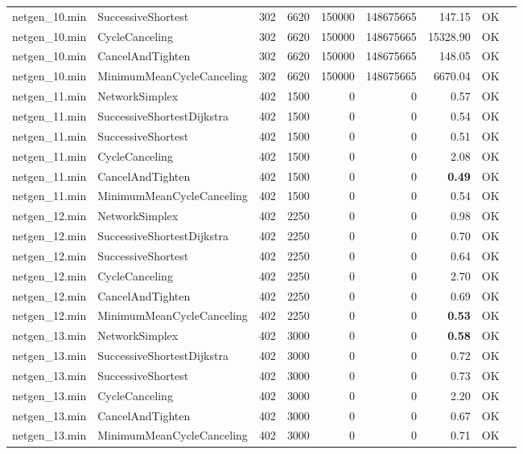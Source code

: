 \begin{longtable}{llrrrrrrl}
netgen\_10.min & SuccessiveShortest & 302 & 6620 & 150000 & 148675665 & 147.15 & OK \\
netgen\_10.min & CycleCanceling & 302 & 6620 & 150000 & 148675665 & 15328.90 & OK \\
netgen\_10.min & CancelAndTighten & 302 & 6620 & 150000 & 148675665 & 148.05 & OK \\
netgen\_10.min & MinimumMeanCycleCanceling & 302 & 6620 & 150000 & 148675665 & 6670.04 & OK \\
\midrule
netgen\_11.min & NetworkSimplex & 402 & 1500 & 0 & 0 & 0.57 & OK \\
netgen\_11.min & SuccessiveShortestDijkstra & 402 & 1500 & 0 & 0 & 0.54 & OK \\
netgen\_11.min & SuccessiveShortest & 402 & 1500 & 0 & 0 & 0.51 & OK \\
netgen\_11.min & CycleCanceling & 402 & 1500 & 0 & 0 & 2.08 & OK \\
netgen\_11.min & CancelAndTighten & 402 & 1500 & 0 & 0 & \textbf{0.49} & OK \\
netgen\_11.min & MinimumMeanCycleCanceling & 402 & 1500 & 0 & 0 & 0.54 & OK \\
\midrule
netgen\_12.min & NetworkSimplex & 402 & 2250 & 0 & 0 & 0.98 & OK \\
netgen\_12.min & SuccessiveShortestDijkstra & 402 & 2250 & 0 & 0 & 0.70 & OK \\
netgen\_12.min & SuccessiveShortest & 402 & 2250 & 0 & 0 & 0.64 & OK \\
netgen\_12.min & CycleCanceling & 402 & 2250 & 0 & 0 & 2.70 & OK \\
netgen\_12.min & CancelAndTighten & 402 & 2250 & 0 & 0 & 0.69 & OK \\
netgen\_12.min & MinimumMeanCycleCanceling & 402 & 2250 & 0 & 0 & \textbf{0.53} & OK \\
\midrule
netgen\_13.min & NetworkSimplex & 402 & 3000 & 0 & 0 & \textbf{0.58} & OK \\
netgen\_13.min & SuccessiveShortestDijkstra & 402 & 3000 & 0 & 0 & 0.72 & OK \\
netgen\_13.min & SuccessiveShortest & 402 & 3000 & 0 & 0 & 0.73 & OK \\
netgen\_13.min & CycleCanceling & 402 & 3000 & 0 & 0 & 2.20 & OK \\
netgen\_13.min & CancelAndTighten & 402 & 3000 & 0 & 0 & 0.67 & OK \\
netgen\_13.min & MinimumMeanCycleCanceling & 402 & 3000 & 0 & 0 & 0.71 & OK \\
\midrule

\end{longtable}
